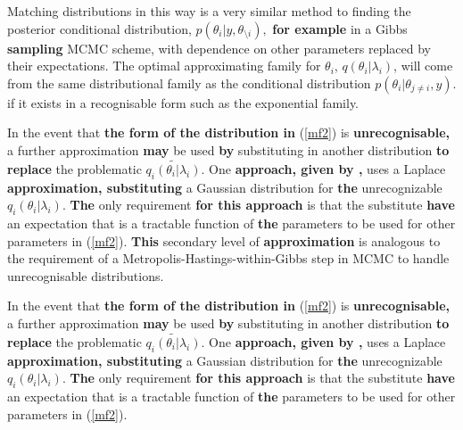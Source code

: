 \documentclass[12pt,a4paper]{article}%
\numberwithin{equation}{section}
\begin{document}
Matching distributions in this way is a very similar method to finding the posterior conditional distribution, $p(\theta_i | y, \theta_{\setminus i}),$ %
{\bf for example} in a Gibbs {\bf sampling} MCMC scheme, with dependence on other parameters replaced by their expectations. The optimal approximating family for $\theta_i$, $q(\theta_i | \lambda_i)$, will come from the same distributional family as the conditional distribution $p(\theta_i | \theta_{j \neq i}, y)$. %
if it exists in a recognisable form such as the exponential family. %

In the event that {\bf the form of the distribution in} (\ref{mf2}) is {\bf unrecognisable,} a further approximation {\bf may} be used {\bf by} substituting in another distribution {\bf to replace} the problematic $\tilde{q_i(\theta_i|\lambda_i)}.$ One {\bf approach, given by \citet{Friston2006},} uses a Laplace {\bf approximation, substituting} a Gaussian distribution for {\bf the} unrecognizable $q_i(\theta_i | \lambda_i)$. {\bf The} only requirement {\bf for this approach} is that the substitute {\bf have} an expectation 
that is a tractable function 
of {\bf the} parameters to be used for other parameters in (\ref{mf2}). 
{\bf This} secondary level of {\bf approximation} is analogous to the requirement of a Metropolis-Hastings-within-Gibbs step in MCMC to handle unrecognisable distributions. %



In the event that {\bf the form of the distribution in} (\ref{mf2}) is {\bf unrecognisable,} a further approximation {\bf may} be used {\bf by} substituting in another distribution {\bf to replace} the problematic $\tilde{q_i(\theta_i|\lambda_i)}.$ One {\bf approach, given by \citet{Friston2006},} uses a Laplace {\bf approximation, substituting} a Gaussian distribution for {\bf the} unrecognizable $q_i(\theta_i | \lambda_i)$. {\bf The} only requirement {\bf for this approach} is that the substitute {\bf have} an expectation 
that is a tractable function 
of {\bf the} parameters to be used for other parameters in (\ref{mf2}). 
\end{document}
